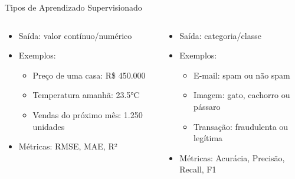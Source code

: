\documentclass[xcolor=dvipsnames,t,aspectratio=169]{beamer} %
\newcommand{\highlight}[1]{{\color{nes_dark_orange} #1}}
\begin{document}
\begin{frame}[c]{Tipos de Aprendizado Supervisionado}
    \begin{columns}[c]
        \begin{column}{0.5\textwidth}
            \begin{display}[Regressão]
                \vspace{.2cm}
                \begin{itemize}
                    \item Saída: valor \highlight{contínuo/numérico}
                    \item Exemplos:
                    \begin{itemize}
                        \item Preço de uma casa: R\$ 450.000
                        \item Temperatura amanhã: 23.5°C
                        \item Vendas do próximo mês: 1.250 unidades
                    \end{itemize}
                    \item Métricas: RMSE, MAE, R²
                \end{itemize}
                \vspace{.2cm}
            \end{display}
        \end{column}
        \begin{column}{0.5\textwidth}
            \begin{display}[Classificação]
                \begin{itemize}
                    \item Saída: \highlight{categoria/classe}
                    \item Exemplos:
                    \begin{itemize}
                        \item E-mail: spam ou não spam
                        \item Imagem: gato, cachorro ou pássaro
                        \item Transação: fraudulenta ou legítima
                    \end{itemize}
                    \item Métricas: Acurácia, Precisão, Recall, F1
                \end{itemize}
            \end{display}
        \end{column}
    \end{columns}
\end{frame}
\end{document}
